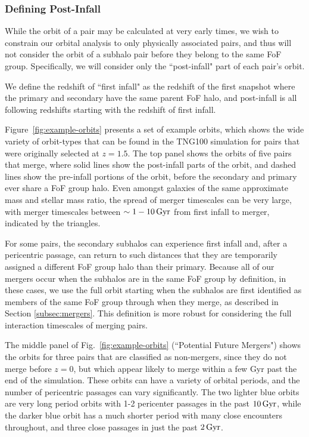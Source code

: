 \documentclass[twocolumn,linenumbers]{aastex631}
\begin{document}
\subsubsection{Defining Post-Infall}
While the orbit of a pair may be calculated at very early times, we wish to constrain our orbital analysis to only physically associated pairs, and thus will not consider the orbit of a subhalo pair before they belong to the same FoF group. Specifically, we will consider only the ``post-infall" part of each pair's orbit. 

We define the redshift of ``first infall" as the redshift of the first snapshot where the primary and secondary have the same parent FoF halo, and post-infall is all following redshifts starting with the redshift of first infall. 

Figure~\ref{fig:example-orbits} presents a set of example orbits, which shows the wide variety of orbit-types that can be found in the TNG100 simulation for pairs that were originally selected at $z=1.5$. 
The top panel shows the orbits of five pairs that merge, where solid lines show the post-infall parts of the orbit, and dashed lines show the pre-infall portions of the orbit, before the secondary and primary ever share a FoF group halo. 
Even amongst galaxies of the same approximate mass and stellar mass ratio, the spread of merger timescales can be very large, with merger timescales between $\sim1-10\,\mathrm{Gyr}$ from first infall to merger,  indicated by the triangles. 

For some pairs, the secondary subhalos can experience first infall and, after a pericentric passage, can return to such distances that they are temporarily assigned a different FoF group halo than their primary. 
Because all of our mergers occur when the subhalos are in the same FoF group by definition, in these cases, we use the full orbit starting when the subhalos are first identified as members of the same FoF group through when they merge, as described in Section \ref{subsec:mergers}.
This definition is more robust for considering the full interaction timescales of merging pairs.

The middle panel of Fig.~\ref{fig:example-orbits} (``Potential Future Mergers") shows the orbits for three pairs that are classified as non-mergers, since they do not merge before $z=0$, but which appear likely to merge within a few Gyr past the end of the simulation. 
These orbits can have a variety of orbital periods, and the number of pericentric passages can vary significantly. 
The two lighter blue orbits are very long period orbits with 1-2 pericenter passages in the past $10\,\mathrm{Gyr}$, while the darker blue orbit has a much shorter period with many close encounters throughout, and three close passages in just the past $2\,\mathrm{Gyr}$.
\end{document}
